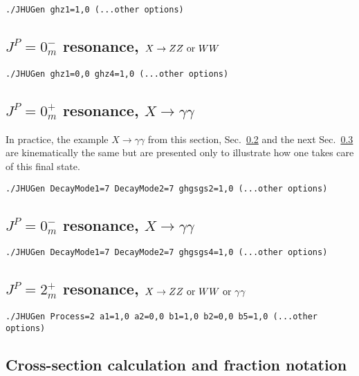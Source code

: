 \documentclass[aps,superscriptaddress,nofootinbib]{revtex4}
\begin{document}
\begin{verbatim}
./JHUGen ghz1=1,0 (...other options)
\end{verbatim}

\subsection{ $J^P = 0^-_m$ resonance, $X \to ZZ~{\rm or}~WW$}
\label{sec:exB}

\begin{verbatim}
./JHUGen ghz1=0,0 ghz4=1,0 (...other options)
\end{verbatim}

\subsection{ $J^P = 0^+_m$ resonance, $X \to \gamma \gamma$}
\label{sec:exC}

In practice, the example $X \to \gamma \gamma$ from this section, Sec.~\ref{sec:exC} and the next Sec.~\ref{sec:exD} are
kinematically the same but are presented only to illustrate how one takes care of this final state.

\begin{verbatim}
./JHUGen DecayMode1=7 DecayMode2=7 ghgsgs2=1,0 (...other options)
\end{verbatim}

\subsection{ $J^P = 0^-_m$ resonance, $X \to \gamma \gamma$}
\label{sec:exD}

\begin{verbatim}
./JHUGen DecayMode1=7 DecayMode2=7 ghgsgs4=1,0 (...other options)
\end{verbatim}

\subsection{ $J^P = 2^+_m$ resonance, $X \to ZZ~{\rm or}~WW~{\rm or}~\gamma \gamma$}

\begin{verbatim}
./JHUGen Process=2 a1=1,0 a2=0,0 b1=1,0 b2=0,0 b5=1,0 (...other options)
\end{verbatim}

\subsection{Cross-section calculation and fraction notation}
\end{document}
